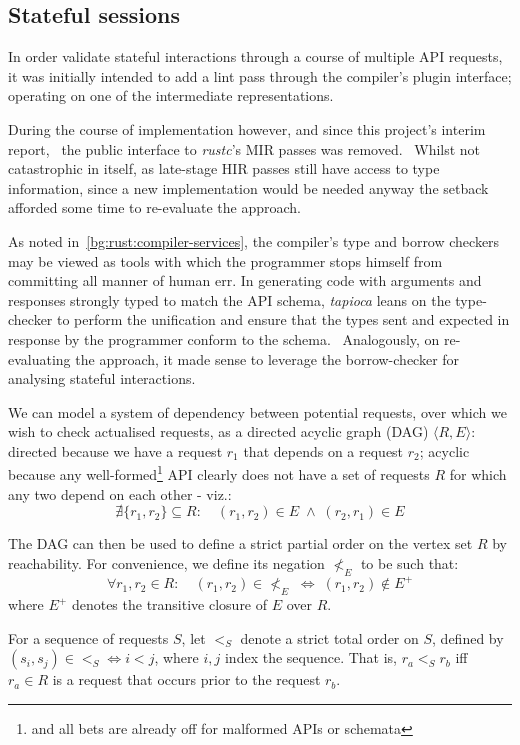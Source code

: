 \subsection{Stateful sessions} \label{impl:sessions}

In order validate stateful interactions through a course of multiple API requests, it was initially intended to add a lint pass through the compiler's plugin interface; operating on one of the intermediate representations.~~\cite{interim}

During the course of implementation however, and since this project's interim report,~\cite{interim} the public interface to \emph{rustc}'s MIR passes was removed.~\cite{rust_pr40239} Whilst not catastrophic in itself, as late-stage HIR passes still have access to type information, since a new implementation would be needed anyway the setback afforded some time to re-evaluate the approach.

As noted in~\cref{bg:rust:compiler-services}, the compiler's type and borrow checkers may be viewed as tools with which the programmer stops himself from committing all manner of human err. In generating code with arguments and responses strongly typed to match the API schema, \emph{tapioca} leans on the type-checker to perform the unification and ensure that the types sent and expected in response by the programmer conform to the schema.~ Analogously, on re-evaluating the approach, it made sense to leverage the borrow-checker for analysing stateful interactions.

We can model a system of dependency between potential requests, over which we wish to check actualised requests, as a directed acyclic graph (DAG) $\langle{R,E}\rangle$: directed because we have a request $r_1$ that depends on a request $r_2$; acyclic because any well-formed\footnote{and all bets are already off for malformed APIs or schemata} API clearly does not have a set of requests $R$ for which any two depend on each other - viz.:\[
\nexists{\{r_1,r_2\}\subseteq{R}}\colon\quad
(r_1, r_2)\in{E} \;\wedge\; (r_2, r_1)\in{E}
\]

The DAG can then be used to define a strict partial order on the vertex set $R$ by reachability. For convenience, we define its negation $\nless_{E}$ to be such that:\[
\forall{r_1,r_2\in{R}}\colon\quad
(r_1, r_2)\in{\nless_{E}} \;\iff\; (r_1, r_2)\notin{E^{+}}
\] where $E^{+}$ denotes the transitive closure of $E$ over $R$.

For a sequence of requests $S$, let $<_{S}$ denote a strict total order on $S$, defined by $(s_i, s_j)\in{<_{S}} \iff i<j$, where $i,j$ index the sequence. That is, $r_a <_{S} r_b$ iff $r_a\in{R}$ is a request that occurs prior to the request $r_b$.

